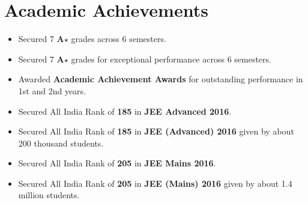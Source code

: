 \section*{Academic Achievements}
\begin{itemize}

\setlength\itemsep{0pt}
\item Secured 7 \textbf{A$\star$} grades across 6 semesters.
\item Secured 7 \textbf{A$\star$} grades for exceptional performance across 6 semesters.
\item Awarded \textbf{Academic Achievement Awards} for outstanding performance in 1st and 2nd years.
\item Secured All India Rank of {\bf 185} in {\bf JEE Advanced 2016}.
\item Secured All India Rank of {\bf 185} in {\bf JEE (Advanced) 2016} given by about 200 thousand students.
\item Secured All India Rank of {\bf 205} in {\bf JEE Mains 2016}.
\item Secured All India Rank of {\bf 205} in {\bf JEE (Mains) 2016} given by about 1.4 million students.

\end{itemize}
